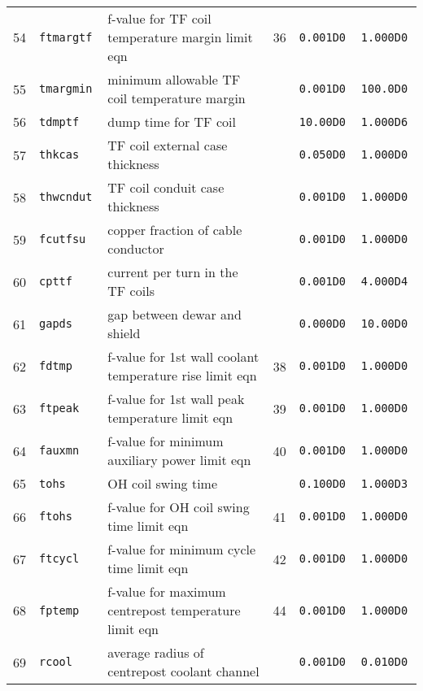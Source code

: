 \begin{table}[tbph]
\begin{center}
\begin{tabular}{||c|l|l|c|c|c||}
54  & \tt ftmargtf    & f-value for TF coil temperature margin limit eqn        & 36        & \tt 0.001D0  & \tt 1.000D0 \\
55  & \tt tmargmin    & minimum allowable TF coil temperature margin            &           & \tt 0.001D0  & \tt 100.0D0 \\
56  & \tt tdmptf      & dump time for TF coil                                   &           & \tt 10.00D0  & \tt 1.000D6 \\
57  & \tt thkcas      & TF coil external case thickness                         &           & \tt 0.050D0  & \tt 1.000D0 \\
58  & \tt thwcndut    & TF coil conduit case thickness                          &           & \tt 0.001D0  & \tt 1.000D0 \\
59  & \tt fcutfsu     & copper fraction of cable conductor                      &           & \tt 0.001D0  & \tt 1.000D0 \\
60  & \tt cpttf       & current per turn in the TF coils                        &           & \tt 0.001D0  & \tt 4.000D4 \\
61  & \tt gapds       & gap between dewar and shield                            &           & \tt 0.000D0  & \tt 10.00D0 \\
62  & \tt fdtmp       & f-value for 1st wall coolant temperature rise limit eqn & 38        & \tt 0.001D0  & \tt 1.000D0 \\
63  & \tt ftpeak      & f-value for 1st wall peak temperature limit eqn         & 39        & \tt 0.001D0  & \tt 1.000D0 \\
64  & \tt fauxmn      & f-value for minimum auxiliary power limit eqn           & 40        & \tt 0.001D0  & \tt 1.000D0 \\
65  & \tt tohs        & OH coil swing time                                      &           & \tt 0.100D0  & \tt 1.000D3 \\
66  & \tt ftohs       & f-value for OH coil swing time limit eqn                & 41        & \tt 0.001D0  & \tt 1.000D0 \\
67  & \tt ftcycl      & f-value for minimum cycle time limit eqn                & 42        & \tt 0.001D0  & \tt 1.000D0 \\
68  & \tt fptemp      & f-value for maximum centrepost temperature limit eqn    & 44        & \tt 0.001D0  & \tt 1.000D0 \\
69  & \tt rcool	      & average radius of centrepost coolant channel            &           & \tt 0.001D0  & \tt 0.010D0 \\

\end{tabular}
\end{center}
\end{table}
